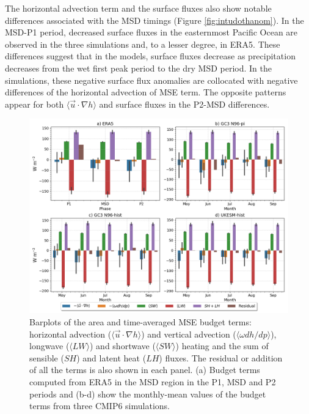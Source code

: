 
The horizontal advection term and the surface fluxes also show notable differences associated with the MSD timings (Figure \ref{fig:intudothanom}). In the MSD-P1 period, decreased surface fluxes in the easternmost Pacific Ocean are observed in the three simulations and, to a lesser degree, in ERA5. These differences suggest that in the models, surface fluxes decrease as precipitation decreases from the wet first peak period to the dry MSD period. In the simulations, these negative surface flux anomalies are collocated with negative differences of the horizontal advection of MSE term. 
The opposite patterns appear for both $\langle \vec{u}\cdot\nabla h \rangle$ and surface fluxes in the P2-MSD differences.


\begin{figure}[t!]
\includegraphics[width=\linewidth]{figures/mse_barplot_era5}
\caption[Barplots of MSE budget terms]{Barplots of the area and time-averaged MSE budget terms: horizontal advection ($\langle \vec{u}\cdot\nabla h \rangle$) and vertical advection ($\langle \omega dh/dp \rangle$), longwave ($\langle LW \rangle$) and shortwave ($\langle SW \rangle$) heating and the sum of sensible ($SH$) and latent heat ($LH$) fluxes. The residual or addition of all the terms is also shown in each panel. (a) Budget terms computed from ERA5 in the MSD region in the P1, MSD and P2 periods and (b-d) show the monthly-mean values of the budget terms from three CMIP6 simulations.  }
\label{fig:thermo_barplot}
\end{figure}

